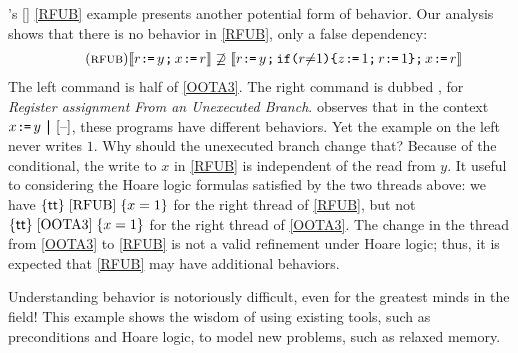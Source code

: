 \citeauthor{BoehmOOTA}'s [\citeyear{BoehmOOTA}] \ref{RFUB} example presents
another potential form of \oota{} behavior.
Our analysis shows that there is no \oota{} behavior in
\ref{RFUB}, only a false dependency:
\begin{gather*}
  \tag{\textsc{rfub}}\label{RFUB}
  \sem{\PR{y}{r}\SEMI \PW{x}{r}}
  \not\supseteq
  \sem{\PR{y}{r}\SEMI \IF{r \NOTEQ 1} \THEN \PW{z}{1}\SEMI \LET{r}{1}\FI \SEMI \PW{x}{r}}
\end{gather*}
The left command is half of \ref{OOTA3}. %
The right command is dubbed \rfub{}, for \emph{Register assignment From an
  Unexecuted Branch}.  \citeauthor{BoehmOOTA} observes that in the context
$\PW{x}{y} \PAR \hole{}$, these programs have different behaviors.  Yet the
\oota{} example on the left never writes $1$.  Why should the unexecuted
branch change that?  Because of the conditional, the write to $x$ in
\ref{RFUB} is independent of the read from $y$.  It useful to considering the
Hoare logic formulas satisfied by the two threads above: we have
$\{\mathsf{tt}\}\allowbreak\;\ref{RFUB}\;\allowbreak\{x=1\}$ for the right thread of \ref{RFUB}, but not
$\{\mathsf{tt}\}\allowbreak\;\ref{OOTA3}\;\allowbreak\{x=1\}$ for the right thread of \ref{OOTA3}.  The
change in the thread from \ref{OOTA3} to \ref{RFUB} is not a valid refinement
under Hoare logic; thus, it is expected that \ref{RFUB} may have additional
behaviors.

Understanding \oota{} behavior is notoriously difficult, even for the
greatest minds in the field!  %
This example shows the wisdom of using existing tools, such as preconditions
and Hoare logic, to model new problems, such as relaxed memory.

